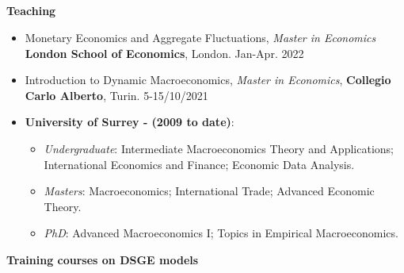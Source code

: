 \documentclass[margin, 11pt]{res} %
\begin{document}
\begin{resume}
\section{}

\textbf{Teaching}

\begin{itemize}
    \item Monetary Economics and Aggregate Fluctuations, \emph{Master in Economics} \textbf{London School of Economics}, London. \hfill Jan-Apr. 2022 
    \item Introduction to Dynamic Macroeconomics, \emph{Master in Economics}, \textbf{Collegio Carlo Alberto}, Turin. \hfill 5-15/10/2021 
    \item \textbf{University of Surrey - (2009 to date)}:

\begin{itemize}
	\item \emph{Undergraduate}: Intermediate Macroeconomics Theory and Applications; International Economics and Finance; Economic Data Analysis. 
	\item \emph{Masters}: Macroeconomics; International Trade; Advanced Economic Theory. 
	\item \emph{PhD}: Advanced Macroeconomics I; Topics in Empirical Macroeconomics. 
\end{itemize}
\end{itemize}


\newpage

\textbf{Training courses on DSGE models}


\end{resume}
\end{document}
